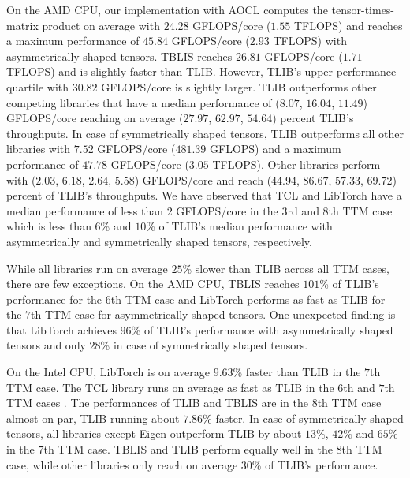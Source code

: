 On the AMD CPU, our implementation with AOCL computes the tensor-times-matrix product on average with $24.28$ GFLOPS/core ($1.55$ TFLOPS) and reaches a maximum performance of $45.84$ GFLOPS/core ($2.93$ TFLOPS) with asymmetrically shaped tensors.
TBLIS reaches $26.81$ GFLOPS/core ($1.71$ TFLOPS) and is slightly faster than TLIB. 
However, TLIB's upper performance quartile with $30.82$ GFLOPS/core is slightly larger. 
TLIB outperforms other competing libraries that have a median performance of ($8.07$, $16.04$, $11.49$) GFLOPS/core reaching on average ($27.97$, $62.97$, $54.64$) percent TLIB's throughputs.
In case of symmetrically shaped tensors, TLIB outperforms all other libraries with $7.52$ GFLOPS/core ($481.39$ GFLOPS) and a maximum performance of $47.78$ GFLOPS/core ($3.05$ TFLOPS).
Other libraries perform with ($2.03$, $6.18$, $2.64$, $5.58$) GFLOPS/core and reach ($44.94$, $86.67$, $57.33$, $69.72$) percent of TLIB's throughputs.
We have observed that TCL and LibTorch have a median performance of less than $2$ GFLOPS/core in the $3$rd and $8$th TTM case which is less than $6$\% and $10$\% of TLIB's median performance with asymmetrically and symmetrically shaped tensors, respectively.

While all libraries run on average $25$\% slower than TLIB across all TTM cases, there are few exceptions.
On the AMD CPU, TBLIS reaches $101$\% of TLIB's performance for the $6$th TTM case and LibTorch performs as fast as TLIB for the $7$th TTM case for asymmetrically shaped tensors.
One unexpected finding is that LibTorch achieves $96$\% of TLIB's performance with asymmetrically shaped tensors and only $28$\% in case of symmetrically shaped tensors.

On the Intel CPU, LibTorch is on average $9.63$\% faster than TLIB in the $7$th TTM case.
The TCL library runs on average as fast as TLIB in the $6$th and $7$th TTM cases .
The performances of TLIB and TBLIS are in the $8$th TTM case almost on par, TLIB running about $7.86$\% faster.
In case of symmetrically shaped tensors, all libraries except Eigen outperform TLIB by about $13$\%, $42$\% and $65$\% in the $7$th TTM case.
TBLIS and TLIB perform equally well in the $8$th TTM case, while other libraries only reach on average $30$\% of TLIB's performance.


